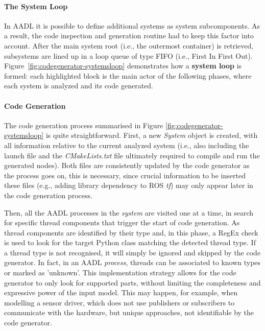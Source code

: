 \paragraph{The System Loop} In AADL it is possible to define additional systems as system subcomponents. As a result, the code inspection and generation routine had to keep this factor into account. After the main system root (i.e., the outermost container) is retrieved, subsystems are lined up in a loop queue of type FIFO (i.e., First In First Out). Figure~\ref{fig:codegenerator-systemsloop} demonstrates how a \textbf{system loop} is formed: each highlighted block is the main actor of the following phases, where each system is analyzed and its code generated.

\paragraph{Code Generation} The code generation process summarised in Figure \ref{fig:codegenerator-systemsloop} is quite straightforward. First, a new \textit{System} object is created, with all information relative to the current analyzed system (i.e., also including the launch file and the \textit{CMakeLists.txt} file ultimately required to compile and run the generated nodes). Both files are consistently updated by the code generator as the process goes on, this is necessary, since crucial information to be inserted these files (e.g., adding library dependency to ROS \textit{tf}) may only appear later in the code generation process.

Then, all the AADL processes in the \textit{system} are visited one at a time, in search for specific thread components that trigger the start of code generation. As thread components are identified by their type and, in this phase, a RegEx check is used to look for the target Python class matching the detected thread type. If a thread type is not recognised, it will simply be ignored and skipped by the code generator. In fact, in an AADL \textit{process}, threads can be associated to known types or marked as 'unknown'. This implementation strategy allows for the code generator to only look for supported parts, without limiting the completeness and expressive power of the input model. This may happen, for example, when modelling a sensor driver, which does not use publishers or subscribers to communicate with the hardware, but unique approaches, not identifiable by the code generator.

